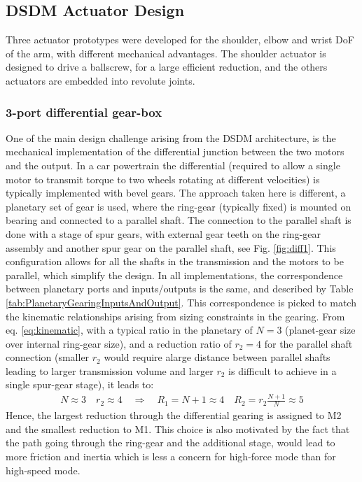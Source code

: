 \subsection{DSDM Actuator Design}
\label{sec:ActuatorDesign}
 
Three actuator prototypes were developed for the shoulder, elbow and wrist DoF of the arm, with different mechanical advantages. The shoulder actuator is designed to drive a ballscrew, for a large efficient reduction, and the others actuators are embedded into revolute joints. 

\subsubsection{3-port differential gear-box}

One of the main design challenge arising from the DSDM architecture, is the mechanical implementation of the differential junction between the two motors and the output. In a car powertrain the differential (required to allow a single motor to transmit torque to two wheels rotating at different velocities) is typically implemented with bevel gears. The approach taken here is different, a planetary set of gear is used, where the ring-gear (typically fixed) is mounted on bearing and connected to a parallel shaft. The connection to the parallel shaft is done with a stage of spur gears, with external gear teeth on the ring-gear assembly and another spur gear on the parallel shaft, see Fig. \ref{fig:diff1}. This configuration allows for all the shafts in the transmission and the motors to be parallel, which simplify the design. In all implementations, the correspondence between planetary ports and inputs/outputs is the same, and described by Table \ref{tab:PlanetaryGearingInputsAndOutput}. This correspondence is picked to match the kinematic relationships arising from sizing constraints in the gearing. From eq. \eqref{eq:kinematic}, with a typical ratio in the planetary of $N=3$ (planet-gear size over internal ring-gear size), and a reduction ratio of $r_2=4$ for the parallel shaft connection (smaller $r_2$ would require alarge distance between parallel shafts leading to larger transmission volume and larger $r_2$ is difficult to achieve in a single spur-gear stage), it leads to:
%
\begin{align}
	N \approx 3 \quad r_2 \approx 4 \quad\Rightarrow\quad R_1 = N+1 \approx 4 \quad R_2 = r_2 \frac{N+1}{N} \approx 5
\end{align}
%
Hence, the largest reduction through the differential gearing is assigned to M2 and the smallest reduction to M1. This choice is also motivated by the fact that the path going through the ring-gear and the additional stage, would lead to more friction and inertia which is less a concern for high-force mode than for high-speed mode. 


